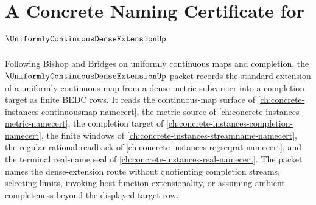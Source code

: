 \chapter{A Concrete Naming Certificate for $\UniformlyContinuousDenseExtensionUp$}
\label{ch:concrete-instances-uniformly-continuous-dense-extension-namecert}

Following Bishop and Bridges on uniformly continuous maps and completion, the $\UniformlyContinuousDenseExtensionUp$ packet records the standard extension of a uniformly continuous map from a dense metric subcarrier into a completion target as finite BEDC rows. It reads the continuous-map surface of \autoref{ch:concrete-instances-continuousmap-namecert}, the metric source of \autoref{ch:concrete-instances-metric-namecert}, the completion target of \autoref{ch:concrete-instances-completion-namecert}, the finite windows of \autoref{ch:concrete-instances-streamname-namecert}, the regular rational readback of \autoref{ch:concrete-instances-regseqrat-namecert}, and the terminal real-name seal of \autoref{ch:concrete-instances-real-namecert}. The packet names the dense-extension route without quotienting completion streams, selecting limits, invoking host function extensionality, or assuming ambient completeness beyond the displayed target row.

